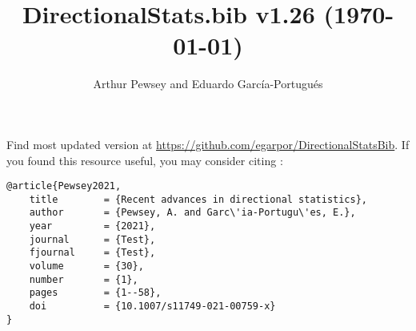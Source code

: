 \documentclass[10pt]{article}
\title{DirectionalStats.bib v1.26 (\today)}
\author{Arthur Pewsey and Eduardo García-Portugués}
\date{}
\begin{document}
\maketitle

Find most updated version at \url{https://github.com/egarpor/DirectionalStatsBib}. If you found this resource useful, you may consider citing \cite{Pewsey2021}:
\begin{verbatim}
@article{Pewsey2021,
    title        = {Recent advances in directional statistics},
    author       = {Pewsey, A. and Garc\'ia-Portugu\'es, E.},
    year         = {2021},
    journal      = {Test},
    fjournal     = {Test},
    volume       = {30},
    number       = {1},
    pages        = {1--58},
    doi          = {10.1007/s11749-021-00759-x}
}
\end{verbatim}

\nocite{*}

\setlength\bibsep{0cm}
\setlength\bibhang{0.25cm}



\end{document}
